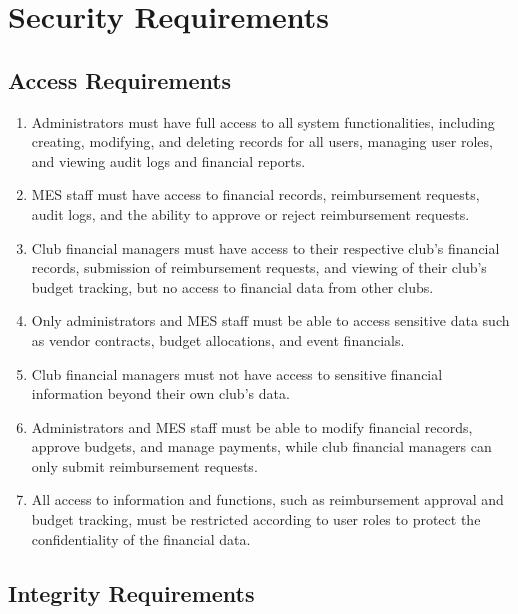 \documentclass[12pt]{article}
\begin{document}
\section{Security Requirements}
\subsection{Access Requirements}

\begin{enumerate}
  \item Administrators must have full access to all system functionalities, including creating, modifying, and deleting records for all users, managing user roles, and viewing audit logs and financial reports.
  \item MES staff must have access to financial records, reimbursement requests, audit logs, and the ability to approve or reject reimbursement requests.
  \item Club financial managers must have access to their respective club's financial records, submission of reimbursement requests, and viewing of their club's budget tracking, but no access to financial data from other clubs.
  \item Only administrators and MES staff must be able to access sensitive data such as vendor contracts, budget allocations, and event financials.
  \item Club financial managers must not have access to sensitive financial information beyond their own club's data.
  \item Administrators and MES staff must be able to modify financial records, approve budgets, and manage payments, while club financial managers can only submit reimbursement requests.
  \item All access to information and functions, such as reimbursement approval and budget tracking, must be restricted according to user roles to protect the confidentiality of the financial data.
\end{enumerate}

\subsection{Integrity Requirements}
\end{document}
